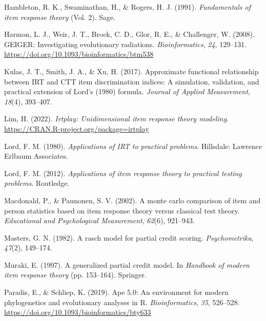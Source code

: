 \documentclass[
  man]{apa6}
\newlength{\cslhangindent}
\newlength{\cslentryspacingunit} %
\newenvironment{CSLReferences}[2] %
 {%
  \setlength{\parindent}{0pt}
  \ifodd #1
  \let\oldpar\par
  \def\par{\hangindent=\cslhangindent\oldpar}
  \fi
  \setlength{\parskip}{#2\cslentryspacingunit}
 }%
 {}
\begin{document}
\begin{CSLReferences}{1}{0}
\leavevmode{}%
Hambleton, R. K., Swaminathan, H., \& Rogers, H. J. (1991). \emph{Fundamentals of item response theory} (Vol. 2). Sage.

\leavevmode{}%
Harmon, L. J., Weir, J. T., Brock, C. D., Glor, R. E., \& Challenger, W. (2008). GEIGER: Investigating evolutionary radiations. \emph{Bioinformatics}, \emph{24}, 129--131. \url{https://doi.org/10.1093/bioinformatics/btm538}

\leavevmode{}%
Kulas, J. T., Smith, J. A., \& Xu, H. (2017). Approximate functional relationship between IRT and CTT item discrimination indices: A simulation, validation, and practical extension of {Lord's} (1980) formula. \emph{Journal of Applied Measurement}, \emph{18}(4), 393--407.

\leavevmode{}%
Lim, H. (2022). \emph{Irtplay: Unidimensional item response theory modeling}. \url{https://CRAN.R-project.org/package=irtplay}

\leavevmode{}%
Lord, F. M. (1980). \emph{Applications of IRT to practical problems}. Hillsdale: Lawrence Erlbaum Associates.

\leavevmode{}%
Lord, F. M. (2012). \emph{Applications of item response theory to practical testing problems}. Routledge.

\leavevmode{}%
Macdonald, P., \& Paunonen, S. V. (2002). A monte carlo comparison of item and person statistics based on item response theory versus classical test theory. \emph{Educational and Psychological Measurement}, \emph{62}(6), 921--943.

\leavevmode{}%
Masters, G. N. (1982). A rasch model for partial credit scoring. \emph{Psychometrika}, \emph{47}(2), 149--174.

\leavevmode{}%
Muraki, E. (1997). A generalized partial credit model. In \emph{Handbook of modern item response theory} (pp. 153--164). Springer.

\leavevmode{}%
Paradis, E., \& Schliep, K. (2019). Ape 5.0: An environment for modern phylogenetics and evolutionary analyses in {R}. \emph{Bioinformatics}, \emph{35}, 526--528. \url{https://doi.org/10.1093/bioinformatics/bty633}


\end{CSLReferences}
\end{document}
